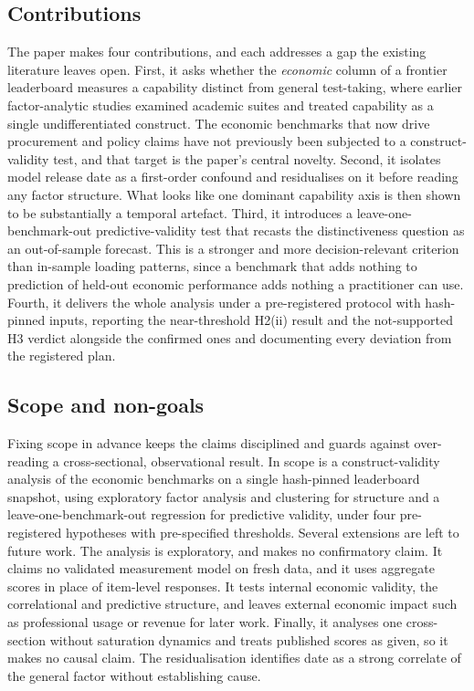 \subsection{Contributions}\label{sec:contributions}
The paper makes four contributions, and each addresses a gap the existing literature leaves open. First,
it asks whether the \emph{economic}
column of a frontier leaderboard measures a capability distinct from general test-taking, where earlier
factor-analytic studies \cite{kearns2026} examined academic suites and treated capability as a single
undifferentiated construct. The economic benchmarks that now drive procurement and policy claims have
not previously been subjected to a construct-validity test, and that target is the paper's
central novelty. Second, it isolates model release date as a first-order confound and residualises on it
before reading any factor structure. What looks like one dominant
capability axis is then shown to be substantially a temporal artefact. Third, it introduces a leave-one-benchmark-out predictive-validity test that recasts the distinctiveness question as an out-of-sample forecast. This is a stronger and more decision-relevant criterion than in-sample loading patterns, since a benchmark
that adds nothing to prediction of held-out economic performance adds nothing a practitioner can use.
Fourth, it delivers the whole analysis under a pre-registered protocol with hash-pinned inputs, reporting
the near-threshold H2(ii) result and the not-supported H3 verdict alongside the confirmed ones
and documenting every deviation from the registered plan.

\subsection{Scope and non-goals}\label{sec:scope}
Fixing scope in advance keeps the claims disciplined and guards against over-reading a cross-sectional,
observational result. In scope is a construct-validity analysis of the economic benchmarks on a single
hash-pinned leaderboard snapshot, using exploratory factor analysis and clustering for structure and a
leave-one-benchmark-out regression for predictive validity, under four pre-registered hypotheses with
pre-specified thresholds. Several extensions are left to future work. The analysis is exploratory, and makes no confirmatory claim. It claims no validated measurement model on fresh data, and it uses aggregate
scores in place of item-level responses. It tests internal economic validity, the correlational and
predictive structure, and leaves external economic impact such as professional usage or revenue for later
work. Finally, it analyses one cross-section without saturation dynamics and treats published scores as
given, so it makes no causal claim. The residualisation identifies date as a strong correlate of the
general factor without establishing cause.

